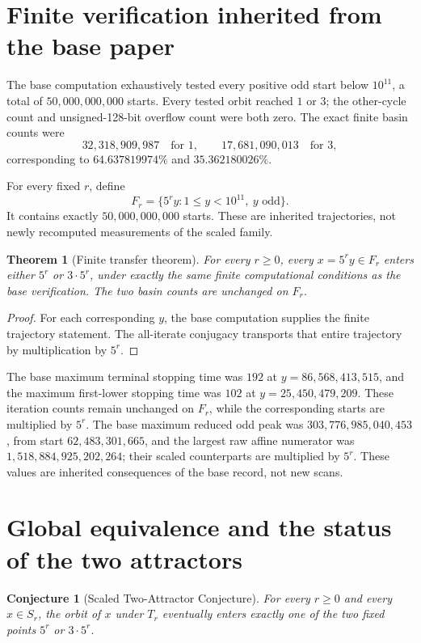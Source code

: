 \documentclass[11pt]{article}
\newtheorem{theorem}{Theorem}
\newtheorem{conjecture}{Conjecture}
\theoremstyle{remark}\newtheorem{remark}{Remark}
\begin{document}
\section{Finite verification inherited from the base paper}
The base computation \cite{BaseMinus} exhaustively tested every positive odd start below $10^{11}$, a total of $50,000,000,000$ starts. Every tested orbit reached $1$ or $3$; the other-cycle count and unsigned-128-bit overflow count were both zero. The exact finite basin counts were
\[
32,318,909,987\quad\text{for }1,
\qquad17,681,090,013\quad\text{for }3,
\]
corresponding to $64.637819974\%$ and $35.362180026\%$.

For every fixed $r$, define
\[
F_r=\{5^ry:1\le y<10^{11},\ y\text{ odd}\}.
\]
It contains exactly $50,000,000,000$ starts. These are inherited trajectories, not newly recomputed measurements of the scaled family.

\begin{theorem}[Finite transfer theorem]
For every $r\ge0$, every $x=5^ry\in F_r$ enters either $5^r$ or $3\cdot5^r$, under exactly the same finite computational conditions as the base verification. The two basin counts are unchanged on $F_r$.
\end{theorem}
\begin{proof}
For each corresponding $y$, the base computation supplies the finite trajectory statement. The all-iterate conjugacy transports that entire trajectory by multiplication by $5^r$.
\end{proof}

The base maximum terminal stopping time was $192$ at $y=86,568,413,515$, and the maximum first-lower stopping time was $102$ at $y=25,450,479,209$. These iteration counts remain unchanged on $F_r$, while the corresponding starts are multiplied by $5^r$. The base maximum reduced odd peak was $303,776,985,040,453$, from start $62,483,301,665$, and the largest raw affine numerator was $1,518,884,925,202,264$; their scaled counterparts are multiplied by $5^r$. These values are inherited consequences of the base record, not new scans.

\section{Global equivalence and the status of the two attractors}
\begin{conjecture}[Scaled Two-Attractor Conjecture]
For every $r\ge0$ and every $x\in S_r$, the orbit of $x$ under $T_r$ eventually enters exactly one of the two fixed points $5^r$ or $3\cdot5^r$.
\end{conjecture}
\end{document}
